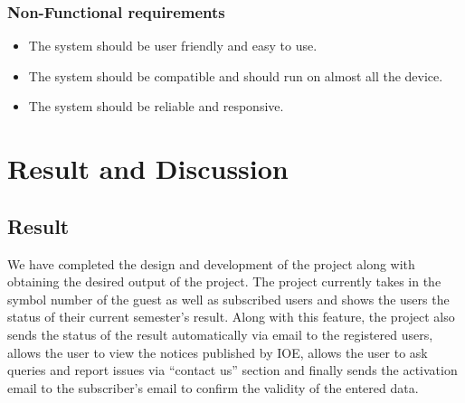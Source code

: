 \subsection{Non-Functional requirements}

\begin{itemize}


	\item The system should be user friendly and easy to use.
	\item The system should be compatible and should run on almost all the device.
	\item The system should be reliable and responsive.
 
\end{itemize}

\chapter{Result and Discussion}

\section{Result}

We have completed the design and development of the project along with obtaining the 
desired output of the project. The project currently takes in the symbol number of the 
guest as well as subscribed users and shows the users the status of their current 
semester’s result. Along with this feature, the project also sends the status of the result 
automatically via email to the registered users, allows the user to view the notices 
published by IOE, allows the user to ask queries and report issues via “contact us” 
section and finally sends the activation email to the subscriber’s email to confirm the 
validity of the entered data. 


